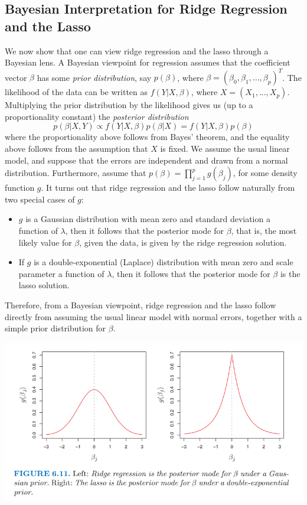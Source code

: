 \subsection{Bayesian Interpretation for Ridge Regression and the Lasso}
We now show that one can view ridge regression and the lasso through
a Bayesian lens. A Bayesian viewpoint for regression assumes that the coefficient vector $\beta$ has some \textit{prior distribution}, say $p(\beta)$, where $\beta = (\beta_0, \beta_1,...,\beta_p)^T$. The likelihood of the data can be written as $f(Y |X, \beta)$, where $X = (X_1,...,X_p)$. Multiplying the prior distribution by the likelihood gives us (up to a proportionality constant) the \textit{posterior distribution}
\begin{equation}
    p(\beta| X, Y) \propto f(Y|X, \beta) p(\beta|X) = f(Y|X, \beta) p(\beta)
\end{equation}
where the proportionality above follows from Bayes’ theorem, and the equality above follows from the assumption that $X$ is fixed. We assume the usual linear model, and suppose that the errors are independent and drawn from a normal distribution. Furthermore, assume that $p(\beta) = \prod_{j=1}^p g(\beta_j)$, for some density
function $g$. It turns out that ridge regression and the lasso follow naturally
from two special cases of $g$:
\begin{itemize}
    \item  $g$ is a Gaussian distribution with mean zero and standard deviation a function of $\lambda$, then it follows that the posterior mode for $\beta$, that is, the most likely value for $\beta$, given the data, is given by the ridge regression solution.

    \item If $g$ is a double-exponential (Laplace) distribution with mean zero and scale parameter a function of $\lambda$, then it follows that the posterior mode for $\beta$ is the lasso solution.
\end{itemize}
Therefore, from a Bayesian viewpoint, ridge regression and the lasso follow directly from assuming the usual linear model with normal errors, together with a simple prior distribution for $\beta$.
\begin{center}
    \includegraphics[scale=0.7]{images/ridge-lasso-bayesian.png}
\end{center}

